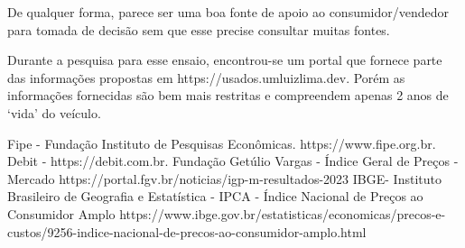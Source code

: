\documentclass[conference]{IEEEtran}
\begin{document}
De qualquer forma, parece ser uma boa fonte de apoio ao consumidor/vendedor para tomada de decisão sem que esse precise consultar muitas fontes.
 
Durante a pesquisa para esse ensaio, encontrou-se um portal que fornece parte das informações propostas em https://usados.umluizlima.dev. Porém as informações fornecidas são bem mais restritas e compreendem apenas 2 anos de `vida' do veículo.


\begin{thebibliography}{00}
	 Fipe - Fundação Instituto de Pesquisas Econômicas. https://www.fipe.org.br.
	 Debit - https://debit.com.br.
	 Fundação Getúlio Vargas - Índice Geral de Preços - Mercado https://portal.fgv.br/noticias/igp-m-resultados-2023
	 IBGE- Instituto Brasileiro de Geografia e Estatística - IPCA - Índice Nacional de Preços ao Consumidor Amplo https://www.ibge.gov.br/estatisticas/economicas/precos-e-custos/9256-indice-nacional-de-precos-ao-consumidor-amplo.html
\end{thebibliography}
\end{document}
